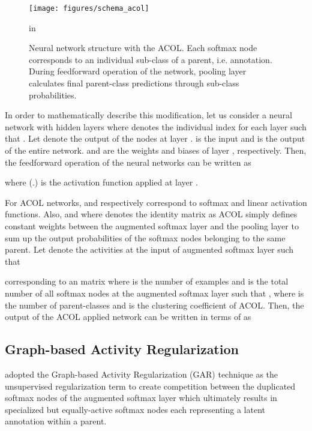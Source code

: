 \documentclass{article} \usepackage{iclr2018_conference,times}
\begin{document}
\begin{figure}[h]
	\begin{center}
		\centerline{\texttt{[image: figures/schema\_acol]}}
		\caption{Neural network structure with the ACOL. Each softmax node corresponds to an individual sub-class of a parent, i.e. annotation. During feedforward operation of the network, pooling layer calculates final parent-class predictions through sub-class probabilities.}
		\label{fig:pseudo_clustering}
	\end{center}
	 in
\end{figure}

In order to mathematically describe this modification, let us consider a neural network with  hidden layers where  denotes the individual index for each layer such that . Let  denote the output of the nodes at layer .  is the input and  is the output of the entire network.  and  are the weights and biases of layer , respectively. Then, the feedforward operation of the neural networks can be written as 

where (.) is the activation function applied at layer . 

For ACOL networks,  and  respectively correspond to softmax and linear activation functions. Also,  and  where  denotes the identity matrix as ACOL simply defines constant weights between the augmented softmax layer and the pooling layer to sum up the output probabilities of the softmax nodes belonging to the same parent. Let  denote the activities at the input of augmented softmax layer such that 
 
corresponding to an  matrix where  is the number of examples and  is the total number of all softmax nodes at the augmented softmax layer such that , where  is the number of parent-classes and  is the clustering coefficient of ACOL.
Then, the output of the ACOL applied network can be written in terms of  as 


\subsection{Graph-based Activity Regularization} 

\citet{KilincU17ACOL} adopted the Graph-based Activity Regularization (GAR) technique \citep{KilincU17GAR} as the unsupervised regularization term to create competition between the duplicated softmax nodes of the augmented softmax layer which ultimately results in specialized but equally-active softmax nodes each representing a latent annotation within a parent.
\end{document}
